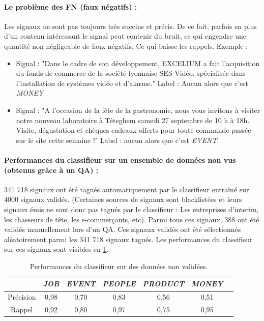                 \paragraph{Le problème des FN (faux négatifs) :}
                    Les signaux ne sont pas toujours très succins et précis. De ce fait, parfois en plus d'un contenu intéressant le signal peut contenir du bruit, ce qui engendre une quantité non négligeable de faux négatifs. Ce qui baisse les rappels. Exemple :
                    \begin{itemize}
                        \item Signal : "Dans le cadre de son développement, EXCELIUM a fait l'acquisition du fonds de commerce de la société lyonnaise SES Vidéo, spécialisée dans l'installation de systèmes vidéo et d'alarme." Label : Aucun alors que c'est \textit{MONEY}
                        \item Signal : "A l'occasion de la fête de la gastronomie, nous vous invitons à visiter notre nouveau laboratoire à Téteghem samedi 27 septembre de 10 h à 18h. Visite, dégustation et chèques cadeaux offerts pour toute commande passée sur le site cette semaine !" Label : aucun alors que c'est \textit{EVENT}
                    \end{itemize}

                \paragraph{Performances du classifieur sur un ensemble de données non vus (obtenus grâce à un QA) :}
                    341 718 signaux ont été tagués automatiquement par le classifieur entraîné sur 4000 signaux validés.
                    (Certaines sources de signaux sont blacklistées et leurs signaux émis ne sont donc pas tagués par le classifieur : Les entreprises d'interim, les chasseurs de tête, les e-commerçants, etc). Parmi tous ces signaux, 388 ont été validés manuellement lors d'un QA. Ces signaux validés ont été sélectionnés aléatoirement parmi les 341 718 signaux tagués. Les performances du classifieur sur ces signaux sont visibles en \ref{tab:classif_perf4}.
                    \begin{table}[t]
                        \centering
                        \begin{tabular}{| c | c | c | c | c | c | c |}
                            \hline
                             & \textit{JOB} & \textit{EVENT} & \textit{PEOPLE} & \textit{PRODUCT} & \textit{MONEY} \\
                            \hline
                            Précision & 0,98 & 0,70 & 0,83 & 0,56 & 0,51 \\
                            Rappel & 0,92 & 0,80 & 0,97 & 0,75 & 0,95 \\
                            \hline
                        \end{tabular}
                        \caption{Performances du classifieur sur des données non validées.}
                        \label{tab:classif_perf4}
                    \end{table}

